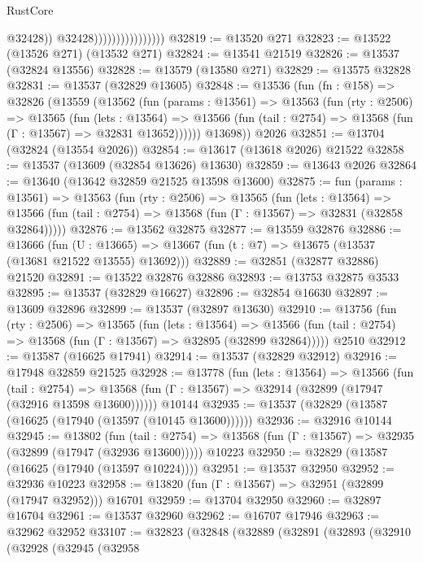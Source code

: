 \begin{lexlean}{RustCore}
\begin{coremodule}
                                        @32428))
                                    @32428))))))))))))))))
@32819 := @13520 @271
@32823 := @13522 (@13526 @271) (@13532 @271)
@32824 := @13541 @21519
@32826 := @13537 (@32824 @13556)
@32828 := @13579 (@13580 @271)
@32829 := @13575 @32828
@32831 := @13537 (@32829 @13605)
@32848 := @13536
    (fun (fn : @158) =>
    @32826
      (@13559
        (@13562
          (fun (params : @13561) =>
          @13563
            (fun (rty : @2506) =>
            @13565
              (fun (lets : @13564) =>
              @13566 (fun (tail : @2754) => @13568 (fun (Γ : @13567) => @32831 @13652))))))
        @13698))
    @2026
@32851 := @13704 (@32824 (@13554 @2026))
@32854 := @13617 (@13618 @2026) @21522
@32858 := @13537 (@13609 (@32854 @13626) @13630)
@32859 := @13643 @2026
@32864 := @13640 (@13642 @32859 @21525 @13598 @13600)
@32875 := fun (params : @13561) =>
  @13563
    (fun (rty : @2506) =>
    @13565
      (fun (lets : @13564) =>
      @13566 (fun (tail : @2754) => @13568 (fun (Γ : @13567) => @32831 (@32858 @32864)))))
@32876 := @13562 @32875
@32877 := @13559 @32876
@32886 := @13666
    (fun (U : @13665) => @13667 (fun (t : @7) => @13675 (@13537 (@13681 @21522 @13555) @13692)))
@32889 := @32851 (@32877 @32886) @21520
@32891 := @13522 @32876 @32886
@32893 := @13753 @32875 @3533
@32895 := @13537 (@32829 @16627)
@32896 := @32854 @16630
@32897 := @13609 @32896
@32899 := @13537 (@32897 @13630)
@32910 := @13756
    (fun (rty : @2506) =>
    @13565
      (fun (lets : @13564) =>
      @13566 (fun (tail : @2754) => @13568 (fun (Γ : @13567) => @32895 (@32899 @32864)))))
    @2510
@32912 := @13587 (@16625 @17941)
@32914 := @13537 (@32829 @32912)
@32916 := @17948 @32859 @21525
@32928 := @13778
    (fun (lets : @13564) =>
    @13566
      (fun (tail : @2754) =>
      @13568 (fun (Γ : @13567) => @32914 (@32899 (@17947 (@32916 @13598 @13600))))))
    @10144
@32935 := @13537 (@32829 (@13587 (@16625 (@17940 (@13597 (@10145 @13600))))))
@32936 := @32916 @10144
@32945 := @13802
    (fun (tail : @2754) => @13568 (fun (Γ : @13567) => @32935 (@32899 (@17947 (@32936 @13600)))))
    @10223
@32950 := @32829 (@13587 (@16625 (@17940 (@13597 @10224))))
@32951 := @13537 @32950
@32952 := @32936 @10223
@32958 := @13820 (fun (Γ : @13567) => @32951 (@32899 (@17947 @32952))) @16701
@32959 := @13704 @32950
@32960 := @32897 @16704
@32961 := @13537 @32960
@32962 := @16707 @17946
@32963 := @32962 @32952
@33107 := @32823
    (@32848
      (@32889
        (@32891
          (@32893
            (@32910
              (@32928
                (@32945
                  (@32958

\end{coremodule}
\end{lexlean}
